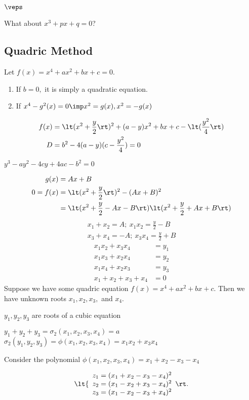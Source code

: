\documentclass[a4paper]{article}
\begin{document}
\begin{ttheorem}

\end{ttheorem}

\begin{example}
  \( \veps \)
\end{example}

\begin{example}
  What about \( x^3+px+q=0 \)?
\end{example}

\subsection{Quadric Method}
Let \( f(x) = x^4+ax^2+bx+c = 0 \). \begin{enumerate}
  \item If \( b=0, \) it is simply a quadratic equation.
  \item If \( x^4-g^2(x) = 0 \imp x^2 = g(x), x^2 = -g(x) \)
\end{enumerate}
\begin{align*}
  f(x) &= \lt(x^2+\frac{y}{2}\rt)^2 + (a-y)x^2+bx+c - \lt(\frac{y^2}{4}\rt) \\
  D &= b^2 - 4(a-y)(c-\frac{y^2}{4}) = 0
\end{align*}
\begin{tdefinition}
  \( y^3-ay^2-4cy+4ac-b^2 = 0 \)
\end{tdefinition}
\begin{align*}
  g(x) &= Ax+B \\
  0 = f(x) &= \lt(x^2+\frac{y}{2}\rt)^2 - (Ax+B)^2 \\
           &= \lt(x^2+\frac{y}{2}-Ax-B\rt)\lt(x^2+\frac{y}{2}+Ax+B\rt) \\
\end{align*}
\begin{align*}
  x_1+x_2 = A;\ x_1x_2 = \frac{y}{2}-B  \\
  x_3+x_4 = -A;\ x_3x_4 = \frac{y}{2}+B
\end{align*}
\begin{align*}
  x_1x_2+x_3x_4 &= y_1 \\
  x_1x_3+x_2x_4 &= y_2 \\
  x_1x_4+x_2x_3 &= y_3 \\
  x_1+x_2+x_3+x_4 &= 0
\end{align*}
Suppose we have some quadric equation \( f(x) = x^4+ax^2+bx+c \). Then we have unknown roots \( x_1, x_2, x_3, \) and \( x_4 \).
\begin{claim}
  \( y_1, y_2, y_3 \) are roots of a cubic equation
\end{claim}
\( y_1+y_2+y_3 = \sigma_2(x_1,x_2,x_3,x_4) = a\) \\
\( \sigma_2(y_1,y_2,y_3) = \phi(x_1,x_2,x_3,x_4) = x_1x_2 + x_3x_4 \)

\begin{example}
  Consider the polynomial \( \phi(x_1,x_2,x_3,x_4) = x_1+x_2-x_3-x_4 \)

  \begin{align*}
    \lt\{
      \begin{array}{l}
      z_1=(x_1+x_2-x_3-x_4)^2\\
      z_2=(x_1-x_2+x_3-x_4)^2\\
      z_3=(x_1-x_2-x_3+x_4)^2
      \end{array}
      \rt.
  \end{align*}
\end{example}
\end{document}
